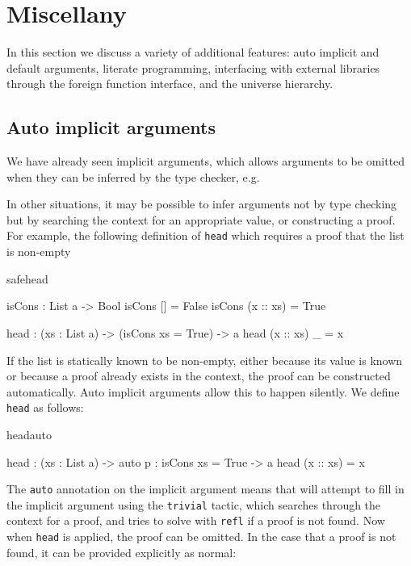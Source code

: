 \section{Miscellany}

In this section we discuss a variety of additional features:
auto implicit and default 
arguments, literate programming, interfacing with external libraries through the
foreign function interface, and the universe hierarchy.

\subsection{Auto implicit arguments}

We have already seen implicit arguments, which allows arguments to be omitted when
they can be inferred by the type checker, e.g.


\noindent
In other situations, it may be possible to infer arguments not by type checking but
by searching the context for an appropriate value, or constructing a proof. For example,
the following definition of \texttt{head} which requires a proof that the list is
non-empty

\begin{SaveVerbatim}{safehead}

isCons : List a -> Bool
isCons [] = False
isCons (x :: xs) = True

head : (xs : List a) -> (isCons xs = True) -> a
head (x :: xs) _ = x

\end{SaveVerbatim}

\noindent
If the list is statically known to be non-empty, either because its value is known or
because a proof already exists in the context, the proof can be constructed
automatically. Auto implicit arguments allow this to happen silently. We define
\texttt{head} as follows:

\begin{SaveVerbatim}{headauto}

head : (xs : List a) -> {auto p : isCons xs = True} -> a
head (x :: xs) = x

\end{SaveVerbatim}

\noindent
The \texttt{auto} annotation on the implicit argument means that \Idris{} will
attempt to fill in the implicit argument using the \texttt{trivial} tactic, which
searches through the context for a proof, and tries to solve with \texttt{refl}
if a proof is not found.
Now when \texttt{head} is applied, the proof can be omitted. In the case that a proof
is not found, it can be provided explicitly as normal:

